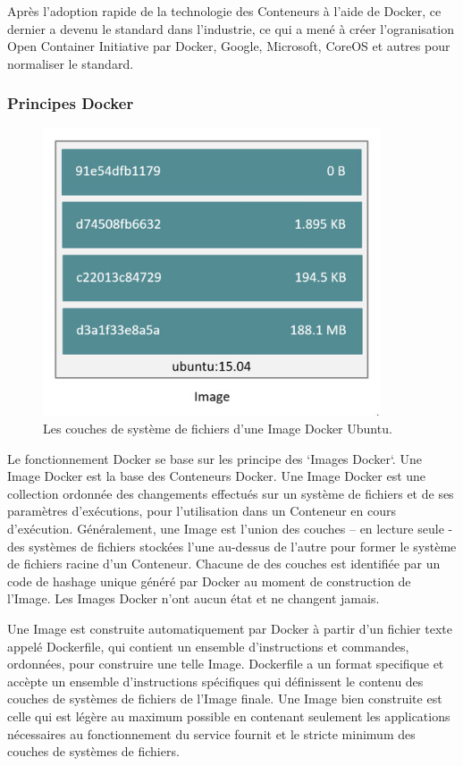 \documentclass[a4paper,11pt,oneside]{report}
\begin{document}
Après l'adoption rapide de la technologie des Conteneurs à l'aide de Docker, ce dernier a devenu le standard dans l'industrie, ce qui a mené à créer l'ogranisation Open Container Initiative par Docker, Google, Microsoft, CoreOS et autres pour normaliser le standard.
\newline

\subsubsection{Principes Docker}

\begin{figure}[H]
    \centering
    \includegraphics[width=10cm]{ubuntu-image.png}
    \caption{Les couches de système de fichiers d'une Image Docker Ubuntu.}
    \label{fig:ubuntu-image}
\end{figure}

Le fonctionnement Docker se base sur les principe des `Images Docker`. Une Image Docker est la base des Conteneurs Docker. Une Image Docker est une collection ordonnée des changements effectués sur un système de fichiers et de ses paramètres d’exécutions, pour l’utilisation dans un Conteneur en cours d’exécution. Généralement, une Image est l’union des couches – en lecture seule - des systèmes de fichiers stockées l’une au-dessus de l’autre pour former le système de fichiers racine d’un Conteneur. Chacune de des couches est identifiée par un code de hashage unique généré par Docker au moment de construction de l’Image. Les Images Docker n’ont aucun état et ne changent jamais.
\newline

Une Image est construite automatiquement par Docker à partir d’un fichier texte appelé Dockerfile, qui contient un ensemble d’instructions et commandes,  ordonnées, pour construire une telle Image. Dockerfile a un format specifique et accèpte un ensemble d’instructions spécifiques qui définissent le contenu des couches de systèmes de fichiers de l’Image finale. Une Image bien construite est celle qui est légère au maximum possible en contenant seulement les applications nécessaires au fonctionnement du service fournit et le stricte minimum des couches de systèmes de fichiers.
\newline
\end{document}

